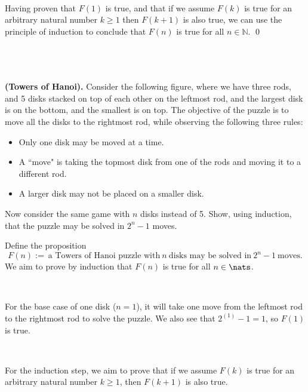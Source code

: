 \documentclass{article}
\begin{document}
\

Having proven that $F( 1)$ is true, and that if we assume $F( k)$ is true for an arbitrary natural number $k\geq 1$ then $F( k+1)$ is also true, we can use the principle of induction to conclude that $F( n)$ is true for all $n\in \mathbb{N}$. \qed

\
\hline
\section{}

\begin{problem*}
    \textbf{(Towers of Hanoi).} Consider the following figure, where we have three rods, and 5 disks stacked on top of each other on the leftmost rod, and the largest disk is on the bottom, and the smallest is on top. The objective of the puzzle is to move all the disks to the rightmost rod, while observing the following three rules: \begin{itemize}
        \item Only one disk may be moved at a time. 
        \item A ``move" is taking the topmost disk from one of the rods and moving it to a different rod.
        \item A larger disk may not be placed on a smaller disk. 
    \end{itemize}
    Now consider the same game with $n$ disks instead of 5. Show, using induction, that the puzzle may be solved in $2^n-1$ moves.
\end{problem*}

Define the proposition 
\begin{equation*}
F( n) :=\ \text{a Towers of Hanoi puzzle with} \ n\ \text{disks may be solved in} \ 2^{n} -1\ \text{moves} .
\end{equation*}
We aim to prove by induction that $F(n)$ is true for all $n \in \nats$.

\

For the base case of one disk ($n=1$), it will take one move from the leftmost rod to the rightmost rod to solve the puzzle. We also see that $2^{( 1)} -1=1$, so $F( 1)$ is true.

\

For the induction step, we aim to prove that if we assume $F( k)$ is true for an arbitrary natural number $k\geq 1$, then $F( k+1)$ is also true.
\end{document}
